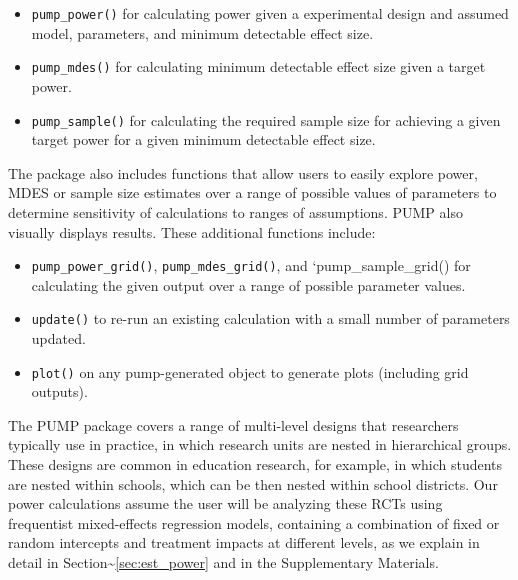 \documentclass[
]{article}
\providecommand{\tightlist}{%
  \setlength{\itemsep}{0pt}\setlength{\parskip}{0pt}}
\begin{document}
\begin{itemize}
\tightlist
\item
  \texttt{pump\_power()} for calculating power given a experimental
  design and assumed model, parameters, and minimum detectable effect
  size.
\item
  \texttt{pump\_mdes()} for calculating minimum detectable effect size
  given a target power.
\item
  \texttt{pump\_sample()} for calculating the required sample size for
  achieving a given target power for a given minimum detectable effect
  size.
\end{itemize}

The package also includes functions that allow users to easily explore
power, MDES or sample size estimates over a range of possible values of
parameters to determine sensitivity of calculations to ranges of
assumptions. PUMP also visually displays results. These additional
functions include:

\begin{itemize}
\tightlist
\item
  \texttt{pump\_power\_grid()}, \texttt{pump\_mdes\_grid()}, and
  `pump\_sample\_grid() for calculating the given output over a range of
  possible parameter values.
\item
  \texttt{update()} to re-run an existing calculation with a small
  number of parameters updated.
\item
  \texttt{plot()} on any pump-generated object to generate plots
  (including grid outputs).
\end{itemize}

The PUMP package covers a range of multi-level designs that researchers
typically use in practice, in which research units are nested in
hierarchical groups. These designs are common in education research, for
example, in which students are nested within schools, which can be then
nested within school districts. Our power calculations assume the user
will be analyzing these RCTs using frequentist mixed-effects regression
models, containing a combination of fixed or random intercepts and
treatment impacts at different levels, as we explain in detail in
Section\textasciitilde{}\ref{sec:est_power} and in the Supplementary
Materials.
\end{document}
